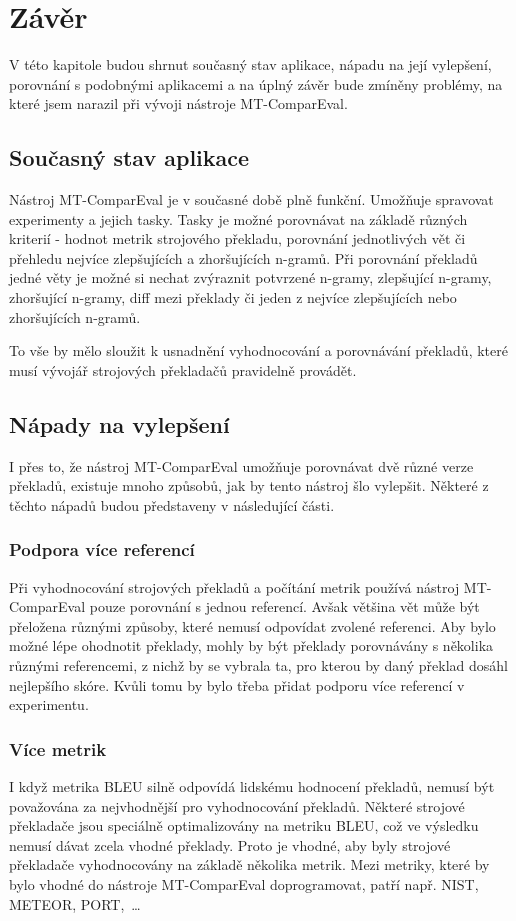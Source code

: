 \chapter{Závěr}
V této kapitole budou shrnut současný stav aplikace,
  nápadu na její vylepšení,
  porovnání s podobnými aplikacemi a
  na úplný závěr bude zmíněny problémy,
  na které jsem narazil při vývoji nástroje MT-ComparEval.

\section{Současný stav aplikace}
Nástroj MT-ComparEval je v současné době plně funkční.
Umožňuje spravovat experimenty a jejich tasky.
Tasky je možné porovnávat na základě různých kriterií -
  hodnot metrik strojového překladu,
  porovnání jednotlivých vět
  či přehledu nejvíce zlepšujících a zhoršujících n-gramů.
Při porovnání překladů jedné věty je možné si nechat zvýraznit
  potvrzené n-gramy, zlepšující n-gramy, zhoršující n-gramy, diff mezi překlady
  či jeden z nejvíce zlepšujících nebo zhoršujících n-gramů.

To vše by mělo sloužit k usnadnění vyhodnocování a porovnávání překladů,
  které musí vývojář strojových překladačů pravidelně provádět.

\section{Nápady na vylepšení}
I přes to, že nástroj MT-ComparEval umožňuje porovnávat dvě různé verze překladů,
  existuje mnoho způsobů,
  jak by tento nástroj šlo vylepšit.
Některé z těchto nápadů budou představeny v následující části.

\subsection{Podpora více referencí}
Při vyhodnocování strojových překladů a počítání metrik používá nástroj MT-ComparEval pouze porovnání s jednou referencí.
Avšak většina vět může být přeložena různými způsoby,
  které nemusí odpovídat zvolené referenci.
Aby bylo možné lépe ohodnotit překlady,
  mohly by být překlady porovnávány s několika různými referencemi,
  z nichž by se vybrala ta,
  pro kterou by daný překlad dosáhl nejlepšího skóre.
Kvůli tomu by bylo třeba přidat podporu více referencí v experimentu.

\subsection{Více metrik}
I když metrika BLEU silně odpovídá lidskému hodnocení překladů,
  nemusí být považována za nejvhodnější pro vyhodnocování překladů.
Některé strojové překladače jsou speciálně optimalizovány na metriku BLEU,
  což ve výsledku nemusí dávat zcela vhodné překlady.
Proto je vhodné,
  aby byly strojové překladače vyhodnocovány na základě několika metrik.
Mezi metriky,
  které by bylo vhodné do nástroje MT-ComparEval doprogramovat,
  patří např. NIST, METEOR, PORT,~\dots

